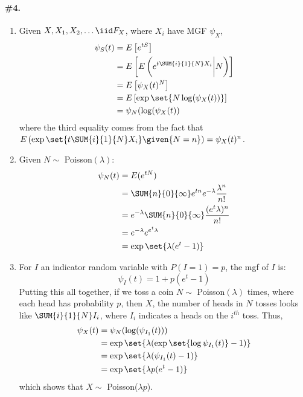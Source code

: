 \documentclass[12pt,titlepage]{article}\usepackage{graphicx, color}
\begin{document}
\paragraph{\#4.}
\begin{enumerate}
\item Given $X, X_1, X_2, \ldots \iid F_{X}$, where $X_i$ have MGF $\psi_{X}$, 
\begin{align*}
\psi_{S}(t) &= E\left[ e^{tS} \right] \\
&= E\left[ E\left( e^{t\SUM{i}{1}{N}X_i} \biggl| {N} \right) \right] \\
&= E\left[ \psi_{X}(t)^{N} \right] \\
&= E\left[ \exp\set{ N \log(\psi_{X}(t))} \right] \\
&= \psi_{N}(\log(\psi_{X}(t))
\end{align*}
where the third equality comes from the fact that $E\left(\exp\set{t\SUM{i}{1}{N}X_i}\given{N=n}\right) = \psi_{X}(t)^{n}$. 
\item Given $N \sim$ Poisson$(\lambda)$:
\begin{align*}
\psi_{N}(t) &= E(e^{tN}) \\
&= \SUM{n}{0}{\infty} e^{tn} e^{-\lambda} \frac{\lambda^n}{n!} \\
&= e^{-\lambda} \SUM{n}{0}{\infty} \frac{(e^t\lambda)^n}{n!} \\
&= e^{-\lambda} e^{e^t \lambda} \\
&= \exp\set{\lambda(e^t-1)}
\end{align*}
\item For $I$ an indicator random variable with $P(I=1) = p$, the mgf of $I$ is: \[\psi_{I}(t) = 1 + p(e^{t}-1)\]
Putting this all together, if we toss a coin $N \sim$ Poisson$(\lambda)$ times, where each head has probability $p$, then $X$, the number of heads in $N$ tosses looks like $\SUM{i}{1}{N} I_i$, where $I_i$ indicates a heads on the $i^{th}$ toss. Thus, 
\begin{align*}
\psi_{X}(t) &= \psi_{N}(\log(\psi_{I_1}(t))) \\
&= \exp\set{\lambda(\exp\set{\log\psi_{I_1}(t)}-1)} \\
&= \exp\set{\lambda(\psi_{I_1}(t) - 1)} \\
&= \exp\set{\lambda p(e^t - 1)}
\end{align*}
which shows that $X \sim $ Poisson($\lambda p$). 
\end{enumerate}
\end{document}
